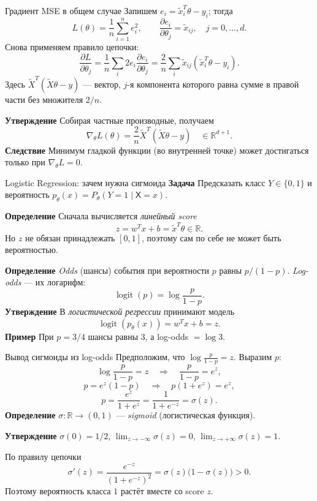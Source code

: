 \documentclass[10pt]{beamer}
\newcommand{\mlBody}{\normalsize}
\newcommand{\mlDefinition}{\textcolor{defblue}{\bfseries Определение}}
\newcommand{\mlStatement}{\textcolor{defblue}{\bfseries Утверждение}}
\newcommand{\mlConsequence}{\textcolor{defblue}{\bfseries Следствие}}
\newcommand{\mlTask}{\textcolor{defblue}{\bfseries Задача}}
\newcommand{\mlExample}{\textcolor{defblue}{\bfseries Пример}}
\begin{document}
\begin{frame}{Градиент MSE в общем случае}
    \mlBody
    Запишем $e_i=\widetilde x_i^T\theta-y_i$; тогда
    \[
       L(\theta)=\frac1n\sum_{i=1}^{n}e_i^2,
       \qquad \frac{\partial e_i}{\partial\theta_j}=\widetilde x_{ij},
       \quad j=0,\ldots,d.
    \]
    Снова применяем правило цепочки:
    \[
       \frac{\partial L}{\partial\theta_j}
       =\frac1n\sum_i 2e_i\frac{\partial e_i}{\partial\theta_j}
       =\frac2n\sum_i \widetilde x_{ij}(\widetilde x_i^T\theta-y_i).
    \]
    Здесь $\widetilde X^T(\widetilde X\theta-y)$ --- вектор, $j$-я компонента которого
    равна сумме в правой части без множителя $2/n$.

    \mlStatement\; Собирая частные производные, получаем
    \[
        \boxed{\nabla_\theta L(\theta)=\frac2n\widetilde X^T(\widetilde X\theta-y)}
        \quad\in\mathbb R^{d+1}.
    \]
    \mlConsequence\; Минимум гладкой функции (во внутренней точке)
    может достигаться только при $\nabla_\theta L=0$.
\end{frame}

\begin{frame}{Logistic Regression: зачем нужна сигмоида}
    \mlBody
    \mlTask\; Предсказать класс $Y\in\{0,1\}$ и вероятность
    $p_\theta(x)=P_\theta(Y=1\mid \mathsf X=x)$.

    \mlDefinition\; Сначала вычисляется \textit{линейный score}
    \[
        z=w^Tx+b=\widetilde x^T\theta\in\mathbb R.
    \]
    Но $z$ не обязан принадлежать $[0,1]$, поэтому сам по себе
    не может быть вероятностью.

    \mlDefinition\; \textit{Odds} (шансы) события при вероятности $p$
    равны $p/(1-p)$. \textit{Log-odds} --- их логарифм:
    \[
       \operatorname{logit}(p)=\log\frac{p}{1-p}.
    \]
    \mlStatement\; В \textit{логистической регрессии} принимают модель
    \[
       \boxed{\operatorname{logit}(p_\theta(x))=w^Tx+b=z}.
    \]
    \mlExample\; При $p=3/4$ шансы равны $3$, а log-odds $=\log3$.
\end{frame}

\begin{frame}{Вывод сигмоиды из log-odds}
    \mlBody
    Предположим, что $\log\frac{p}{1-p}=z$. Выразим $p$:
    \[
       \log\frac{p}{1-p}=z
       \quad\Longrightarrow\quad
       \frac{p}{1-p}=e^z,
    \]
    \[
       p=e^z(1-p)
       \quad\Longrightarrow\quad
       p(1+e^z)=e^z,
    \]
    \[
       \boxed{p=\frac{e^z}{1+e^z}=\frac1{1+e^{-z}}=\sigma(z)}.
    \]
    \mlDefinition\; $\sigma:\mathbb R\to(0,1)$ ---
    \textit{sigmoid} (логистическая функция).

    \mlStatement\; $\sigma(0)=1/2$,
    $\lim_{z\to-\infty}\sigma(z)=0$,
    $\lim_{z\to+\infty}\sigma(z)=1$.

    По правилу цепочки
    \[
       \boxed{\sigma'(z)=\frac{e^{-z}}{(1+e^{-z})^2}
       =\sigma(z)\bigl(1-\sigma(z)\bigr)>0}.
    \]
    Поэтому вероятность класса $1$ растёт вместе со score $z$.
\end{frame}
\end{document}
